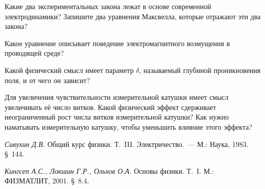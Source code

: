\begin{lab:questions}
\item Какие два экспериментальных закона лежат в основе современной электродинамики? Запишите два уравнения Максвелла,
которые отражают эти два закона?

\item Какое уравнение описывает поведение электромагнитного возмущения в проводящей среде?

\item Какой физический смысл имеет параметр $\delta$, называемый глубиной проникновения поля, и от чего он зависит?

\item Для увеличения чувствительности измерительной катушки имеет смысл увеличивать её число витков. Какой физический
эффект сдерживает неограниченный рост числа витков измерительной катушки? Как нужно наматывать измерительную катушку,
чтобы уменьшить влияние этого эффекта?
\end{lab:questions}


\begin{lab:literature}
\item {\em Сивухин Д.В.} Общий курс физики. Т.~III. Электричество.~--- М.: Наука, 1983. \S~144.

\item {\em Кингсеп А.С., Локшин Г.Р., Ольхов О.А.} Основы физики. Т.~I. М.: ФИЗМАТЛИТ, 2001. \S~8.4.
\end{lab:literature}
